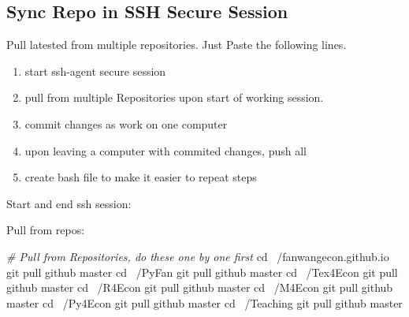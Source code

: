 \documentclass[]{article}
\newenvironment{Shaded}{\begin{snugshade}}{\end{snugshade}}
\newcommand{\BuiltInTok}[1]{#1}
\newcommand{\CommentTok}[1]{\textcolor[rgb]{0.56,0.35,0.01}{\textit{#1}}}
\newcommand{\FunctionTok}[1]{\textcolor[rgb]{0.00,0.00,0.00}{#1}}
\newcommand{\NormalTok}[1]{#1}
\newcommand{\StringTok}[1]{\textcolor[rgb]{0.31,0.60,0.02}{#1}}
\newcommand{\VariableTok}[1]{\textcolor[rgb]{0.00,0.00,0.00}{#1}}
\providecommand{\tightlist}{%
  \setlength{\itemsep}{0pt}\setlength{\parskip}{0pt}}
\begin{document}
\hypertarget{sync-repo-in-ssh-secure-session}{%
\subsection{Sync Repo in SSH Secure
Session}\label{sync-repo-in-ssh-secure-session}}

Pull latested from multiple repositories. Just Paste the following
lines.

\begin{enumerate}
\def\labelenumi{\arabic{enumi}.}
\tightlist
\item
  start ssh-agent secure session
\item
  pull from multiple Repositories upon start of working session.
\item
  commit changes as work on one computer
\item
  upon leaving a computer with commited changes, push all
\item
  create bash file to make it easier to repeat steps
\end{enumerate}

Start and end ssh session:

\begin{Shaded}
\end{Shaded}

Pull from repos:

\begin{Shaded}
\begin{Highlighting}[]
\CommentTok{# Pull from Repositories, do these one by one first}
\BuiltInTok{cd}\NormalTok{ ~/fanwangecon.github.io}
\FunctionTok{git}\NormalTok{ pull github master}
\BuiltInTok{cd}\NormalTok{ ~/PyFan}
\FunctionTok{git}\NormalTok{ pull github master}
\BuiltInTok{cd}\NormalTok{ ~/Tex4Econ}
\FunctionTok{git}\NormalTok{ pull github master}
\BuiltInTok{cd}\NormalTok{ ~/R4Econ}
\FunctionTok{git}\NormalTok{ pull github master}
\BuiltInTok{cd}\NormalTok{ ~/M4Econ}
\FunctionTok{git}\NormalTok{ pull github master}
\BuiltInTok{cd}\NormalTok{ ~/Py4Econ}
\FunctionTok{git}\NormalTok{ pull github master}
\BuiltInTok{cd}\NormalTok{ ~/Teaching}
\FunctionTok{git}\NormalTok{ pull github master}
\end{Highlighting}
\end{Shaded}
\end{document}
